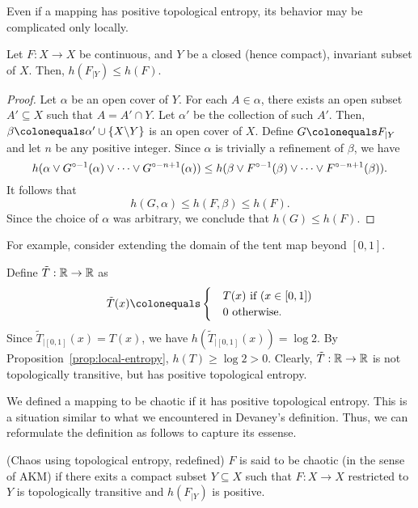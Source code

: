 \documentclass[12pt,twoside,draft]{book}
\begin{document}
  Even if a mapping has positive topological entropy, its behavior may be complicated only locally.
  \begin{proposition}
    Let $F: X \to X$ be continuous, and $Y$ be a closed (hence compact), invariant subset of $X$.
    Then, $h(F_{|Y}) \leq h(F)$.
    \label{prop:local-entropy}
    \begin{proof}
      Let $\alpha$ be an open cover of $Y$.
      For each $A \in \alpha$, there exists an open subset $A' \subseteq X$ such that $A = A' \cap Y$.
      Let $\alpha'$ be the collection of such $A'$.
      Then, $\beta \ceq \alpha' \cup \set{X\bs Y}$ is an open cover of $X$.
      Define $G \ceq F_{|Y}$ and let $n$ be any positive integer.
      Since $\alpha$ is trivially a refinement of $\beta$, we have
      \begin{equation*}
        h(\alpha \vee G^{\circ -1}(\alpha) \vee \cdots \vee G^{\circ -n+1}(\alpha)) 
        \leq
        h(\beta \vee F^{\circ -1}(\beta) \vee \cdots \vee F^{\circ -n+1}(\beta)).
      \end{equation*}
      It follows that
      \begin{equation*}
        h(G, \alpha) \leq h(F, \beta) \leq h(F).
      \end{equation*}
      Since the choice of $\alpha$ was arbitrary, we conclude that $h(G) \leq h(F)$.
    \end{proof}
  \end{proposition}
  For example, consider extending the domain of the tent map beyond $[0,1]$.
  \begin{example}
    Define $\tilde{T}: \mathbb{R} \to \mathbb{R}$ as
    \begin{equation*}
      \tilde{T}(x) 
      \ceq \begin{cases}
        &T(x) \mbox{ if } (x \in [0,1]) \\
        &0 \mbox{ otherwise}.
      \end{cases}
    \end{equation*}
    Since $\tilde{T}_{|[0,1]}(x) = T(x)$, we have $h(\tilde{T}_{|[0,1]}(x)) = \log 2$. 
    By Proposition~\ref{prop:local-entropy}, $h(T) \geq \log 2 > 0$.
    Clearly, $\tilde{T}: \mathbb{R} \to \mathbb{R}$ is not topologically transitive, but has positive topological entropy.
  \end{example}
  We defined a mapping to be chaotic if it has positive topological entropy.
  This is a situation similar to what we encountered in Devaney's definition.
  Thus, we can reformulate the definition as follows to capture its essense.
  \begin{definition}
    (Chaos using topological entropy, redefined)
    $F$ is said to be chaotic (in the sense of AKM) if there exits a compact subset $Y \subseteq X$ such that $F: X \to X$ restricted to $Y$ is topologically transitive and $h(F_{|Y})$ is positive.
  \end{definition}
\end{document}

